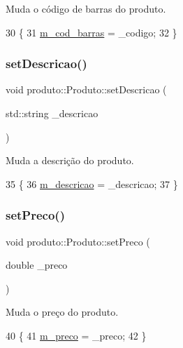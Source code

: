 Muda o código de barras do produto. 


\begin{DoxyCode}
30                                            \{
31         \hyperlink{classproduto_1_1Produto_af441e885b23e4b6782be22c0be25ba72}{m\_cod\_barras} = \_codigo;
32     \}
\end{DoxyCode}
\mbox{\label{classproduto_1_1Produto_ad4398a2c1dbc54dc2b164df3b2798dc8}} 
\subsubsection{\texorpdfstring{set\+Descricao()}{setDescricao()}}
{\footnotesize\ttfamily void produto\+::\+Produto\+::set\+Descricao (\begin{DoxyParamCaption}\item[{std\+::string}]{\+\_\+descricao }\end{DoxyParamCaption})}



Muda a descrição do produto. 


\begin{DoxyCode}
35                                               \{
36         \hyperlink{classproduto_1_1Produto_a17af898b167c20f905f3d2d16f7aeac0}{m\_descricao} = \_descricao;
37     \}
\end{DoxyCode}
\mbox{\label{classproduto_1_1Produto_ac2b62968f13523baabc910e0ca10a412}} 
\subsubsection{\texorpdfstring{set\+Preco()}{setPreco()}}
{\footnotesize\ttfamily void produto\+::\+Produto\+::set\+Preco (\begin{DoxyParamCaption}\item[{double}]{\+\_\+preco }\end{DoxyParamCaption})}



Muda o preço do produto. 


\begin{DoxyCode}
40                                    \{
41         \hyperlink{classproduto_1_1Produto_aaa3f0f133345202eafcb2fa72248e05d}{m\_preco} = \_preco;
42     \}
\end{DoxyCode}


